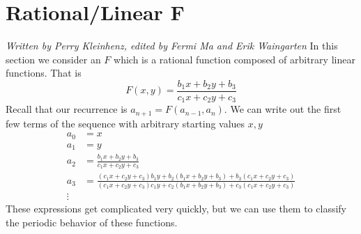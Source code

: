 \documentclass[12pt]{article}
\begin{document}
\section{Rational/Linear F}
\emph{Written by Perry Kleinhenz, edited by Fermi Ma and Erik Waingarten}
In this section we consider an $F$ which is a rational function composed of arbitrary linear functions. That is 
\begin{equation}
\label{rationallinear}
F(x,y) = \frac{ b_1 x + b_2 y + b_3}{ c_1 x+ c_2 y + c_3}
\end{equation}
Recall that our recurrence is $a_{n+1} = F( a_{n-1}, a_n)$. We can write out the first few terms of the sequence with arbitrary starting values $x,y$
\begin{align}
a_0 &= x \\ 
a_1 &=y \\
a_2 &= \frac{ b_1 x + b_2 y + b_3}{ c_1 x+ c_2 y + c_3}\\
\label{athree}a_3 &= \frac{(c_1 x+ c_2 y + c_3) b_1 y + b_2 (b_1 x + b_2 y + b_3)+ b_3(c_1 x+ c_2 y + c_3)}{ (c_1 x+ c_2 y + c_3)c_1 y+ c_2 (b_1 x + b_2 y + b_3) + c_3(c_1 x+ c_2 y + c_3)} \\
\vdots
\end{align}
These expressions get complicated very quickly, but we can use them to classify the periodic behavior of these functions.
\end{document}

